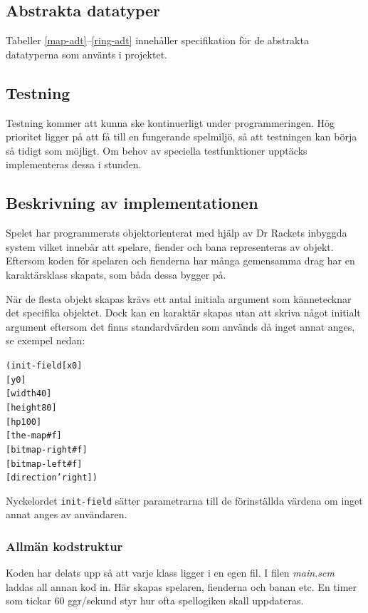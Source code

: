 \documentclass{scrartcl}
\newcommand{\code}[1]%
{\texttt{#1}}
\newcommand{\filename}[1]%
{\textsl{#1}}
\begin{document}
\subsection{Abstrakta datatyper}
Tabeller \ref{map-adt}--\ref{ring-adt} innehåller specifikation för de abstrakta datatyperna som använts i projektet.



\subsection{Testning}
Testning kommer att kunna ske kontinuerligt under programmeringen. Hög prioritet ligger på att få till en fungerande spelmiljö, så att testningen kan börja så tidigt som möjligt. Om behov av speciella testfunktioner upptäcks implementeras dessa i stunden.

\subsection{Beskrivning av implementationen}
Spelet har programmerats objektorienterat med hjälp av Dr Rackets inbyggda system vilket innebär att spelare, fiender och bana representeras av objekt. Eftersom koden för spelaren och fienderna har många gemensamma drag har en karaktärsklass skapats, som båda dessa bygger på.

När de flesta objekt skapas krävs ett antal initiala argument som kännetecknar det specifika objektet. Dock kan en karaktär skapas utan att skriva något initialt argument eftersom det finns standardvärden som används då inget annat anges, se exempel nedan:

\begin{alltt}
(init-field [x 0]
            [y 0]
            [width 40]
            [height 80]
            [hp 100]
            [the-map #f]
            [bitmap-right #f]
            [bitmap-left #f]
            [direction 'right])
\end{alltt}         

Nyckelordet \code{init-field} sätter parametrarna till de förinställda värdena om inget annat anges av användaren. 

\subsubsection{Allmän kodstruktur}

Koden har delats upp så att varje klass ligger i en egen fil. I filen \filename{main.scm} laddas all annan kod in. Här skapas spelaren, fienderna och banan etc. En timer som tickar 60 ggr/sekund styr hur ofta spellogiken skall uppdateras. 
\end{document}
